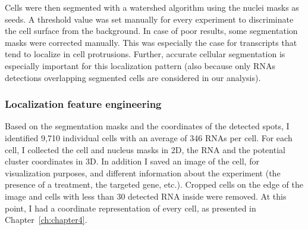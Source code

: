 Cells were then segmented with a watershed algorithm using the nuclei masks as seeds.
A threshold value was set manually for every experiment to discriminate the cell surface from the background.
In case of poor results, some segmentation masks were corrected manually.
This was especially the case for transcripts that tend to localize in cell protrusions.
Further, accurate cellular segmentation is especially important for this localization pattern (also because only RNAs detections overlapping segmented cells are considered in our analysis).

\subsubsection{Localization feature engineering}

Based on the segmentation masks and the coordinates of the detected spots, I identified 9,710 individual cells with an average of 346 \ac{RNA}s per cell.
For each cell, I collected the cell and nucleus masks in 2D, the \ac{RNA} and the potential cluster coordinates in 3D.
In addition I saved an image of the cell, for visualization purposes, and different information about the experiment (the presence of a treatment, the targeted gene, etc.).
Cropped cells on the edge of the image and cells with less than 30 detected \ac{RNA} inside were removed.
At this point, I had a coordinate representation of every cell, as presented in Chapter~\ref{ch:chapter4}.


